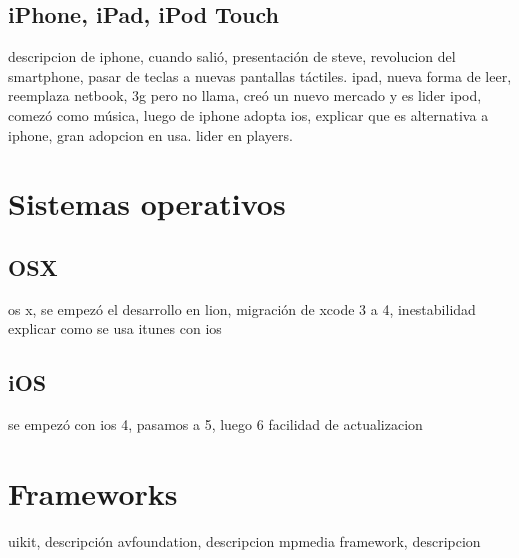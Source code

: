 		\subsection{iPhone, iPad, iPod Touch}
		descripcion de iphone, cuando salió, presentación de steve, revolucion del smartphone, pasar de teclas a nuevas pantallas táctiles.
		ipad, nueva forma de leer, reemplaza netbook, 3g pero no llama, creó un nuevo mercado y es lider
		ipod, comezó como música, luego de iphone adopta ios, explicar que es alternativa a iphone, gran adopcion en usa.  lider en players.
	\section{Sistemas operativos}
		\subsection{OSX}
		os x, se empezó el desarrollo en lion, migración de xcode 3 a 4, inestabilidad
		explicar como se usa  itunes con ios
		\subsection{iOS}
		se empezó con ios 4, pasamos a 5, luego 6		
		facilidad de actualizacion
	\section{Frameworks}
	uikit, descripción 
	avfoundation, descripcion
	mpmedia framework, descripcion
	
